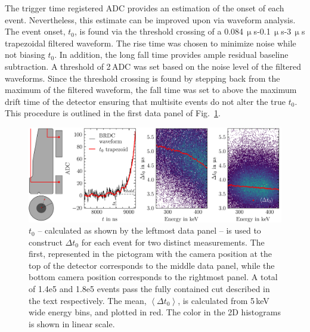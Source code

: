 The trigger time registered ADC provides an estimation of the onset of each event. Nevertheless, this estimate can be improved upon via waveform analysis. The event onset, $t_0$, is found via the threshold crossing of a 0.084\,$\upmu$s-0.1\,$\upmu$s-3\,$\upmu$s trapezoidal filtered waveform. The rise time was chosen to minimize noise while not biasing $t_0$. In addition, the long fall time provides ample residual baseline subtraction. A threshold of 2\,ADC was set based on the noise level of the filtered waveforms. Since the threshold crossing is found by stepping back from the maximum of the filtered waveform, the fall time was set to above the maximum drift time of the detector ensuring that multisite events do not alter the true $t_0$. This procedure is outlined in the first data panel of Fig.~\ref{fig:t0_bias}.
\begin{figure}[htb]
    \centering
    \includegraphics[width=6in]{figs/param/t0_bias.png}
    \caption{$t_0$ -- calculated as shown by the leftmost data panel -- is used to construct $\Delta t_0$ for each event for two distinct measurements. The first, represented in the pictogram with the camera position at the top of the detector corresponds to the middle data panel, while the bottom camera position corresponds to the rightmost panel. A total of 1.4e5 and 1.8e5 events pass the fully contained cut described in the text respectively. The mean, $\left< \Delta t_0 \right>$, is calculated from 5\,keV wide energy bins, and plotted in red. The color in the 2D histograms is shown in linear scale.}
    \label{fig:t0_bias}
\end{figure}

